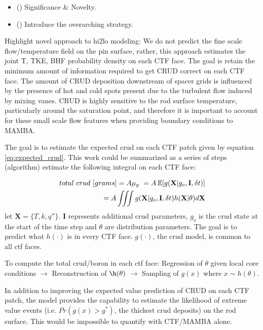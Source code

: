 
\begin{itemize}
    \item (\checkmark) Significance & Novelty.
    \item (\checkmark) Introduce the overarching strategy.
\end{itemize}

Highlight novel approach to hi2lo modeling:  We do not predict the fine scale flow/temperature field on the pin surface, rather, this approach estimates the joint T, TKE, BHF probability density on each CTF face.  The goal is retain the minimum amount of information required to get CRUD correct on each CTF face.  The amount of CRUD deposition downstream of spacer grids is influenced by the presence of hot and cold spots present due to the turbulent flow induced by mixing vanes.  CRUD is highly sensitive to the rod surface temperature, particularly around the saturation point, and therefore it is important to account for these small scale flow features when providing boundary conditions to MAMBA.

The goal is to estimate the expected crud on each CTF patch given by equation \ref{eq:expected_crud}.
This work could be summarized as a series of steps (algorithm) estimate the following integral on each CTF face:

\begin{eqnarray}
        total\ crud\ [grams] = A \mu_g\ = A \operatorname*{\mathbb{E}}[g(\mathbf X|g_o, \mathbf I, \delta t)] \nonumber \\
	= A \iiint g(\mathbf X|g_o, \mathbf I, \delta t) h(\mathbf X|\theta) d \mathbf X
	\label{eq:expected_crud}
\end{eqnarray}
let $\mathbf X= \{T, k, q''\}$. $\mathbf I$ represents additional crud parameters, $g_o$ is the crud state at the start of the time step and $\theta$ are distribution parameters.  The goal is to predict what $h(\cdot)$ is in every CTF face.  $g(\cdot)$, the crud model, is common to all ctf faces.

To compute the total crud/boron in each ctf face:
Regression of $\theta$ given local core conditions $\rightarrow$ Reconstruction of $\h(\theta)$ $\rightarrow$ Sampling of $g(x)$ where $x \sim h(\theta)$.

In addition to improving the expected value prediction of CRUD on each CTF patch, the model provides the capability to estimate the likelihood of extreme value events (i.e. $Pr(g(x) > g^*)$, the thickest crud deposits) on the rod surface.  This would be impossible to quantify with CTF/MAMBA alone.

